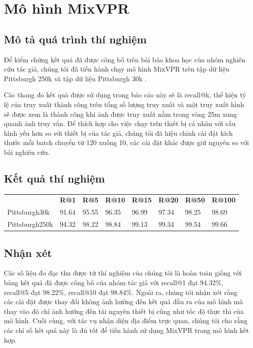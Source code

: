 \section{Mô hình MixVPR}
\subsection*{Mô tả quá trình thí nghiệm}

Để kiểm chứng kết quả đã được công bố trên bài báo khoa học của nhóm nghiên cứu tác giả, chúng tôi đã tiến hành chạy mô hình MixVPR \cite{alibey2023mixvpr} trên tập dữ liệu Pittsburgh 250k \cite{6618963} và tập dữ liệu Pittsburgh 30k \cite{6618963}.

Các thang đo kết quả được sử dụng trong báo cáo này sẽ là recall@k, thể hiện tỷ lệ của truy xuất thành công trên tổng số lượng truy xuất và một truy xuất hình sẽ được xem là thành công khi ảnh được truy xuất nằm trong vòng 25m xung quanh ảnh truy vấn. Để thích hợp cho việc chạy trên thiết bị cá nhân với cấu hình yếu hơn so với thiết bị của tác giả, chúng tôi đã hiệu chỉnh cài đặt kích thước mỗi batch chuyển từ 120 xuống 10, các cài đặt khác được giữ nguyên so với bài nghiên cứu.

\subsection*{Kết quả thí nghiệm}

\begin{table}[H]
	\begin{tabular}{llllllll}
		               & \textbf{R@1} & \textbf{R@5} & \textbf{R@10} & \textbf{R@15} & \textbf{R@20} & \textbf{R@50} & \textbf{R@100} \\
		Pittsburgh30k  & 91.64        & 95.55        & 96.35         & 96.99         & 97.34         & 98.25         & 98.69          \\
		Pittsburgh250k & 94.32        & 98.22        & 98.84         & 99.13         & 99.34         & 99.54         & 99.66
	\end{tabular}
\end{table}

\subsection*{Nhận xét}

Các số liệu đo đạc thu được từ thí nghiệm của chúng tôi là hoàn toàn giống với bảng kết quả đã được công bố của nhóm tác giả với recall@1 đạt 94.32\%, recall@5 đạt 98.22\%, recall@10 đạt 98.84\%. Ngoài ra, chúng tôi nhận xét rằng các cài đặt được thay đổi không ảnh hưởng đến kết quả đầu ra của mô hình mà thay vào đó chỉ ảnh hưởng đến tài nguyên thiết bị cũng như tốc độ thực thi của mô hình. Cuối cùng, với tác vụ nhận diện địa điểm trực quan, chúng tôi cho rằng các chỉ số kết quả này là đủ tốt để tiến hành sử dụng MixVPR trong mô hình kết hợp.

